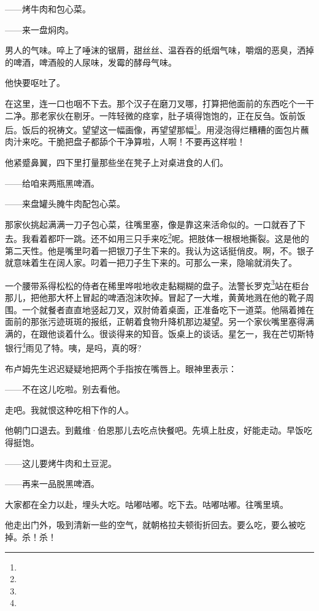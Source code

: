 \par ——烤牛肉和包心菜。
\par ——来一盘焖肉。
\par 男人的气味。啐上了唾沫的锯屑，甜丝丝、温吞吞的纸烟气味，嚼烟的恶臭，洒掉的啤酒，啤酒般的人尿味，发霉的酵母气味。
\par 他快要呕吐了。
\par 在这里，连一口也咽不下去。那个汉子在磨刀叉哪，打算把他面前的东西吃个一干二净。那老家伙在剔牙。一阵轻微的痉挛，肚子填得饱饱的，正在反刍。饭前饭后。饭后的祝祷文。望望这一幅画像，再望望那幅\footnote{}。用浸泡得烂糟糟的面包片蘸肉汁来吃。干脆把盘子都舔个干净算啦，人啊！不要再这样啦！
\par 他紧蹙鼻翼，四下里打量那些坐在凳子上对桌进食的人们。
\par ——给咱来两瓶黑啤酒。
\par ——来盘罐头腌牛肉配包心菜。
\par 那家伙挑起满满一刀子包心菜，往嘴里塞，像是靠这来活命似的。一口就吞了下去。我看着都吓一跳。还不如用三只手来吃\footnote{}呢。把肢体一根根地撕裂。这是他的第二天性。他是嘴里叼着一把银刀子生下来的。我认为这话挺俏皮。啊，不。银子就意味着生在阔人家。叼着一把刀子生下来的。可那么一来，隐喻就消失了。
\par 一个腰带系得松松的侍者在稀里哗啦地收走黏糊糊的盘子。法警长罗克\footnote{}站在柜台那儿，把他那大杯上冒起的啤酒泡沫吹掉。冒起了一大堆，黄黄地溅在他的靴子周围。一个就餐者直直地竖起刀叉，双肘倚着桌面，正准备吃下一道菜。他隔着摊在面前的那张污迹斑斑的报纸，正朝着食物升降机那边凝望。另一个家伙嘴里塞得满满的，在跟他谈着什么。很谈得来的知音。饭桌上的谈话。星乞一，我在芒切斯特银行\footnote{}雨见了特。咦，是吗，真的呀?
\par 布卢姆先生迟迟疑疑地把两个手指按在嘴唇上。眼神里表示：
\par ——不在这儿吃啦。别去看他。
\par 走吧。我就恨这种吃相下作的人。
\par 他朝门口退去。到戴维·伯恩那儿去吃点快餐吧。先填上肚皮，好能走动。早饭吃得挺饱。
\par ——这儿要烤牛肉和土豆泥。
\par ——再来一品脱黑啤酒。
\par 大家都在全力以赴，埋头大吃。咕嘟咕嘟。吃下去。咕嘟咕嘟。往嘴里填。
\par 他走出门外，吸到清新一些的空气，就朝格拉夫顿街折回去。要么吃，要么被吃掉。杀！杀！
